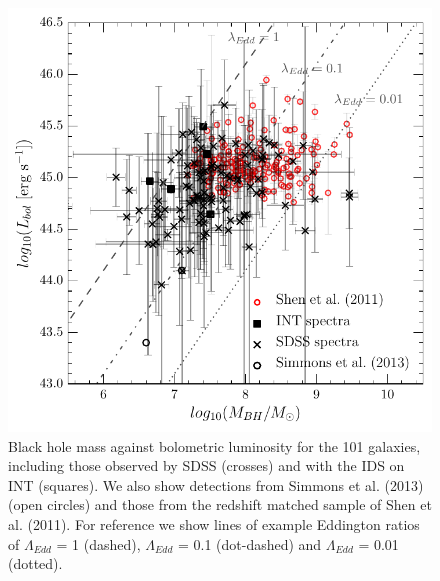 {\begin{figure}
\centering
\includegraphics[width=\textwidth]{agn/mass_bh_bol_luminosity_with_all_errors_shen_11.pdf}
\caption[Black hole mass against luminosity for the bulgeless AGN sample]{Black hole mass against bolometric luminosity for the 101 galaxies, including those observed by SDSS (crosses) and with the IDS on INT (squares). We also show detections from {\notebsm Simmons et al. (2013)} (open circles) and those from the redshift matched sample of {\notebsm Shen et al. (2011)}. For reference we show lines of example Eddington ratios of $\Lambda_{Edd}$ = 1 (dashed),  $\Lambda_{Edd}$ = 0.1 (dot-dashed) and $\Lambda_{Edd}$ = 0.01 (dotted).
}
\label{fig:mbhvsbol}
\end{figure}

}
